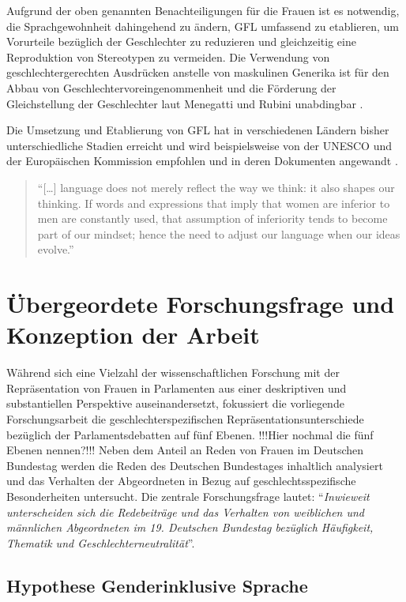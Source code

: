\documentclass[12pt, 
    twoside=false, 
    bibliography=totoc, 
    numbers=endperiod, 
    headings=normal, 
    toc=chapterentrydotfill
    ]{scrbook}
\begin{document}
Aufgrund der oben genannten Benachteiligungen für die Frauen ist es notwendig, die Sprachgewohnheit dahingehend zu ändern, GFL umfassend zu etablieren, um Vorurteile bezüglich der Geschlechter zu reduzieren und gleichzeitig eine Reproduktion von Stereotypen zu vermeiden. Die Verwendung von geschlechtergerechten Ausdrücken anstelle von maskulinen Generika ist für den Abbau von Geschlechtervoreingenommenheit und die Förderung der Gleichstellung der Geschlechter laut Menegatti und Rubini unabdingbar \parencite*{menegatti_2017}.

Die Umsetzung und Etablierung von GFL hat in verschiedenen Ländern bisher unterschiedliche Stadien erreicht und wird beispielsweise von der UNESCO und der Europäischen Kommission empfohlen und in deren Dokumenten angewandt \parencite[4]{sczesny_2016}.

\begin{quote}
    \enquote{[…] language does not merely reflect the way we think: it also shapes our thinking. If words and expressions that imply that women are inferior to men are constantly used, that assumption of inferiority tends to become part of our mindset; hence the need to adjust our language when our ideas evolve.} \parencite {unesco_2011} 
\end{quote}

\chapter{Übergeordete Forschungsfrage und Konzeption der Arbeit}

Während sich eine Vielzahl der wissenschaftlichen Forschung mit der Repräsentation von Frauen in Parlamenten aus einer deskriptiven und substantiellen Perspektive auseinandersetzt, fokussiert die vorliegende Forschungsarbeit die geschlechterspezifischen Repräsentationsunterschiede bezüglich der Parlamentsdebatten auf fünf Ebenen. !!!Hier nochmal die fünf Ebenen nennen?!!!
Neben dem Anteil an Reden von Frauen im Deutschen Bundestag werden die Reden des Deutschen Bundestages inhaltlich analysiert und das Verhalten der Abgeordneten in Bezug auf geschlechtsspezifische Besonderheiten untersucht. Die zentrale Forschungsfrage lautet: \enquote{\emph{Inwieweit unterscheiden sich die Redebeiträge und das Verhalten von weiblichen und männlichen Abgeordneten im 19. Deutschen Bundestag bezüglich Häufigkeit, Thematik und Geschlechterneutralität}}.


\section{Hypothese Genderinklusive Sprache}
\end{document}
